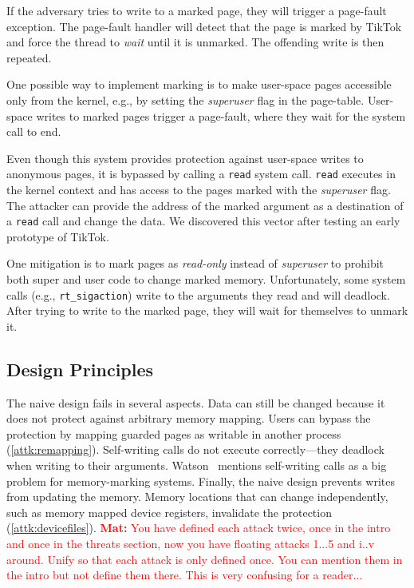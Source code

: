 \documentclass[conference]{IEEEtran}
\newcommand{\mat}[1]{\textcolor{red}{\textbf{Mat:} #1}}
\newcommand{\sysname}{TikTok}
\begin{document}
If the adversary tries to write to a marked page, they will trigger a
page-fault exception. The page-fault handler will detect that the page is marked
by \sysname{} and force the thread to \emph{wait} until it is unmarked. The
offending write is then repeated. 

One possible way to implement marking is to make user-space pages accessible
only from the kernel, e.g., by setting
the \emph{superuser} flag in the page-table. User-space writes to marked pages
trigger a page-fault, where they wait for the system call to end.

Even though this system provides protection against user-space
writes to anonymous pages, it is bypassed by calling a \texttt{read}
system call. \texttt{read} executes in the kernel context and has access to 
the pages marked with the \emph{superuser} flag. The attacker can provide the
address of the marked argument as a destination of a \texttt{read} call and 
change the data. We discovered this vector after testing an early prototype of
\sysname{}.

One mitigation is to mark pages as \emph{read-only} instead of \emph{superuser}
to prohibit both super and user code to change marked memory.  Unfortunately,
some system calls (e.g., \texttt{rt\_sigaction}) write to the arguments they
read and will deadlock.  After trying to write to the marked page, they will
wait for themselves to unmark it.

\subsection{Design Principles}
\label{subsec:designprinciples}

The naive design fails in several aspects. Data can still be changed because it
does not protect against arbitrary memory mapping. Users can bypass the
protection by mapping guarded pages as writable in another process
(\autoref{attk:remapping}). Self-writing calls do not execute correctly---they
deadlock when writing to their arguments. Watson~\cite{watson2007exploiting}
mentions self-writing calls as a big problem for memory-marking systems.
Finally, the naive design prevents writes from updating the memory. Memory locations
that can change independently, such as memory mapped device registers,
invalidate the protection (\autoref{attk:devicefiles}).
\mat{You have defined each attack twice, once in the intro and once in the
threats section, now you have floating attacks 1...5 and i..v around. Unify so
that each attack is only defined once. You can mention them in the intro but not
define them there. This is very confusing for a reader...}
\end{document}
